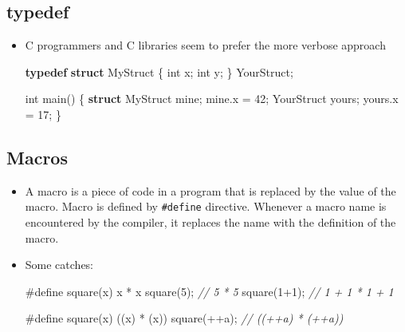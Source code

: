 \documentclass[]{article}
\newenvironment{Shaded}{}{}
\newcommand{\KeywordTok}[1]{\textcolor[rgb]{0.00,0.44,0.13}{\textbf{#1}}}
\newcommand{\DataTypeTok}[1]{\textcolor[rgb]{0.56,0.13,0.00}{#1}}
\newcommand{\DecValTok}[1]{\textcolor[rgb]{0.25,0.63,0.44}{#1}}
\newcommand{\StringTok}[1]{\textcolor[rgb]{0.25,0.44,0.63}{#1}}
\newcommand{\CommentTok}[1]{\textcolor[rgb]{0.38,0.63,0.69}{\textit{#1}}}
\newcommand{\PreprocessorTok}[1]{\textcolor[rgb]{0.74,0.48,0.00}{#1}}
\newcommand{\NormalTok}[1]{#1}
\begin{document}
\subsection{\texorpdfstring{\textbf{typedef}}{typedef}}\label{header-n111}

\begin{itemize}
\item
  C programmers and C libraries seem to prefer the more verbose approach

\begin{Shaded}
\begin{Highlighting}[]
\KeywordTok{typedef} \KeywordTok{struct}\NormalTok{ MyStruct \{}
    \DataTypeTok{int}\NormalTok{ x;}
    \DataTypeTok{int}\NormalTok{ y;}
\NormalTok{\} YourStruct;}

\DataTypeTok{int}\NormalTok{ main() \{}
    \KeywordTok{struct}\NormalTok{ MyStruct mine;}
\NormalTok{    mine.x = }\DecValTok{42}\NormalTok{;}
\NormalTok{    YourStruct yours;}
\NormalTok{    yours.x = }\DecValTok{17}\NormalTok{;}
\NormalTok{\}}
\end{Highlighting}
\end{Shaded}
\end{itemize}

\subsection{\texorpdfstring{\textbf{Macros}}{Macros}}\label{header-n117}

\begin{itemize}
\item
  A macro is a piece of code in a program that is replaced by the value
  of the macro. Macro is defined by \texttt{\#define} directive.
  Whenever a macro name is encountered by the compiler, it replaces the
  name with the definition of the macro.

\begin{Shaded}
\end{Shaded}
\item
  Some catches:

\begin{Shaded}
\begin{Highlighting}[]
\PreprocessorTok{#define square(x) x * x}
\NormalTok{square(}\DecValTok{5}\NormalTok{); 		}\CommentTok{// 5 * 5}
\NormalTok{square(}\DecValTok{1}\NormalTok{+}\DecValTok{1}\NormalTok{);	}\CommentTok{// 1 + 1 * 1 + 1}

\PreprocessorTok{#define square(x) ((x) * (x))}
\NormalTok{square(++a); 	}\CommentTok{// ((++a) * (++a))}
\end{Highlighting}
\end{Shaded}
\end{itemize}
\end{document}

